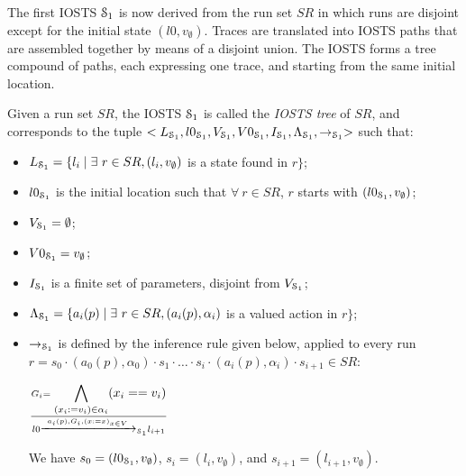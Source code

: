 The first IOSTS $\EuScript{S}_1$ is now derived from the run set
$SR$ in which runs are disjoint except for the initial state
$(l0,v_\emptyset)$. Traces are translated into IOSTS paths that
are assembled together by means of a disjoint union. The IOSTS
forms a tree compound of paths, each expressing one trace, and
starting from the same initial location.

\begin{definition}
    Given a run set $SR$, the IOSTS $\EuScript{S}_1$ is called
    the \emph{IOSTS tree} of $SR$, and corresponds to the tuple
    $<L_{\EuScript{S}_1}, l0_{\EuScript{S}_1},V_{\EuScript{S}_1},
    V0_{\EuScript{S}_1}, I_{\EuScript{S}_1},
    \Lambda_{\EuScript{S}_1},\rightarrow_{\EuScript{S}_1}>$ such
    that:

    \begin{itemize}

    \item $L_{\EuScript{S}_1}= \{l_i \mid \exists ~r \in SR,
        (l_i,v_\emptyset)$ is a state found in $r\}$;

    \item $l0_{\EuScript{S}_1}$ is the initial location such that
        $\forall ~r \in SR$, $r$ starts with
        $(l0_{\EuScript{S}_1},v_\emptyset)$;

    \item $V_{\EuScript{S}_1}=\emptyset$;

    \item $V0_{\EuScript{S}_1}=v_\emptyset$;

    \item $I_{\EuScript{S}_1}$ is a finite set of parameters,
        disjoint from $V_{\EuScript{S}_1}$;

    \item $\Lambda_{\EuScript{S}_1}= \{a_i(p) \mid \exists ~r \in SR,
        (a_i(p),\alpha_i)$ is a valued action in $r\}$;

    \item $\rightarrow_{\EuScript{S}_1}$ is defined by the
        inference rule given below, applied to every run
        $r = s_0 \cdot (a_0(p),\alpha_0) \cdot s_1 \cdot \dots \cdot
        s_i \cdot (a_i(p),\alpha_i) \cdot s_{i+1} \in SR$:

        \begin{center}
            {\Large
            $\frac{G_i=\displaystyle \bigwedge_{(x_i:=v_i) \in
            \alpha_i} (x_i==v_i)}
            {l0 \xrightarrow{a_i(p),G_i,(x:=x)_{x\in
            V}}_{\EuScript{S}_1} l_{i+1}}$
        }
        \end{center}

        We have $s_0 = (l0_{\EuScript{S}_1}, v_{\emptyset})$, $s_i = (l_i,
        v_{\emptyset})$, and $s_{i+1} = (l_{i+1}, v_{\emptyset})$.
    \end{itemize}

    \label{IOSTS_tree}
\end{definition}

